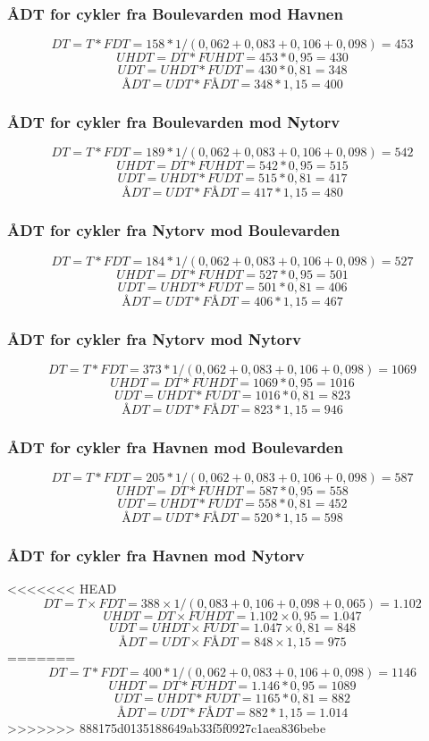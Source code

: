 \subsubsection{ÅDT for cykler fra Boulevarden mod Havnen}
$$DT = T * FDT = 158 * 1/(0,062 +0,083+0,106+0,098) = 453$$
$$UHDT = DT * FUHDT = 453 * 0,95 = 430$$
$$UDT = UHDT * FUDT = 430 * 0,81 = 348$$
$$ÅDT = UDT * FÅDT = 348 * 1,15 = 400$$
\subsubsection{ÅDT for cykler fra Boulevarden mod Nytorv}
$$DT = T * FDT = 189 * 1/(0,062 +0,083+0,106+0,098) = 542$$
$$UHDT = DT * FUHDT = 542 * 0,95 = 515$$
$$UDT = UHDT * FUDT = 515 * 0,81 = 417$$
$$ÅDT = UDT * FÅDT = 417 * 1,15 = 480$$
\subsubsection{ÅDT for cykler fra Nytorv mod Boulevarden}
$$DT = T * FDT = 184* 1/(0,062 +0,083+0,106+0,098) = 527$$
$$UHDT = DT * FUHDT = 527 * 0,95 = 501$$
$$UDT = UHDT * FUDT = 501 * 0,81 = 406$$
$$ÅDT = UDT * FÅDT = 406 * 1,15 = 467$$
\subsubsection{ÅDT for cykler fra Nytorv mod Nytorv}
$$DT = T * FDT = 373 * 1/(0,062 +0,083+0,106+0,098) = 1069$$
$$UHDT = DT * FUHDT = 1069 * 0,95 = 1016$$
$$UDT = UHDT * FUDT = 1016 * 0,81 = 823$$
$$ÅDT = UDT * FÅDT = 823 * 1,15 = 946$$
\subsubsection{ÅDT for cykler fra Havnen mod Boulevarden}
$$DT = T * FDT = 205* 1/(0,062 +0,083+0,106+0,098) = 587$$
$$UHDT = DT * FUHDT = 587 * 0,95 = 558$$
$$UDT = UHDT * FUDT = 558 * 0,81 = 452$$
$$ÅDT = UDT * FÅDT = 520 * 1,15 = 598$$
\subsubsection{ÅDT for cykler fra Havnen mod Nytorv}
<<<<<<< HEAD
$$DT = T \times FDT = 388 \times 1/(0,083+0,106+0,098+0,065) = 1.102$$
$$UHDT = DT \times FUHDT = 1.102 \times 0,95 = 1.047$$
$$UDT = UHDT \times FUDT = 1.047 \times 0,81 = 848$$
$$ÅDT = UDT \times FÅDT = 848 \times 1,15 = 975$$
=======
$$DT = T * FDT = 400* 1/(0,062 +0,083+0,106+0,098)  = 1146$$
$$UHDT = DT * FUHDT = 1.146 * 0,95 = 1089$$
$$UDT = UHDT * FUDT = 1165 * 0,81 = 882$$
$$ÅDT = UDT * FÅDT = 882 * 1,15 = 1.014$$
>>>>>>> 888175d0135188649ab33f5f0927c1aea836bebe
